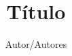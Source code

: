 \documentclass{beamer}
\title[Instituto de Automática (INAUT)]{ Título }
\author[Autores abreviados]{Autor/Autores}
\institute[UNSJ]{Universidad Nacional de San Juan\\
Instituto de Automática\\ 
	\url{ autor@inaut.unsj.edu.ar }\\
}
\date{} %
\begin{document}
\justifying
\begin{frame}
\titlepage 
\end{frame}
\end{document}
